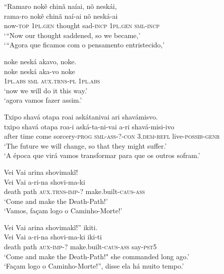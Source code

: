 \documentclass[output=paper,
modfonts,nonflat
]{langsci/langscibook}
\begin{document}
\ea ``Ramaro nokẽ chinã naíai, nõ neskái, \\[.3em]
\gll rama-ro         nokẽ             chinã   naí-ai            nõ               neská-ai          \\
     now-\textsc{top} \textsc{1pl.gen} thought sad-\textsc{incp} \textsc{1pl.gen} \textsc{sml-incp} \\
\glt ‘“Now our thought saddened, so we became,' \\
`“Agora que ficamos com o pensamento entristecido,' \\
\z

\ea noke neská akavo, noke. \\[.3em]
\gll noke             neská        aka-vo               noke             \\
     \textsc{1pl.abs} \textsc{sml} \textsc{aux.trns-pl} \textsc{1pl.abs} \\
\glt `now we will do it this way.' \\
`agora vamos fazer assim.'\\
\z

\ea Txipo shavá otapa roai askátanivai ari shavámisvo. \\[.3em]
\gll txipo shavá otapa roa-i                 aská-ta-ni-vai         a-ri                shavá-misi-ivo            \\
     after time  come  sorcery-\textsc{prog} \textsc{sml-ass-?-con} 3.\textsc{dem-refl} live-\textsc{possib-genr} \\
\glt `The future we will change, so that they might suffer.' \\
`A época que virá vamos transformar para que os outros sofram.'\\
\z

\ea Vei Vai arina shovimakĩ! \\[.3em]
\gll Vei   Vai  a-ri-na                 shovi-ma-ki                  \\
     death path \textsc{aux.trns-imp-?} make.built-\textsc{caus-ass} \\
\glt `Come and make the Death-Path!' \\
`Vamos, façam logo o Caminho-Morte!' \\
\z

\ea Vei Vai arina shovimakĩ!'' ikiti. \\[.3em]
\gll Vei   Vai  a-ri-na            shovi-ma-ki                  iki-ti            \\
     death path \textsc{aux-imp-?} make.built-\textsc{caus-ass} say-\textsc{pst5} \\
\glt `Come and make the Death-Path!" she commanded long ago.' \\
`Façam logo o Caminho-Morte!”, disse ela há muito tempo.'\\
\z
\end{document}
